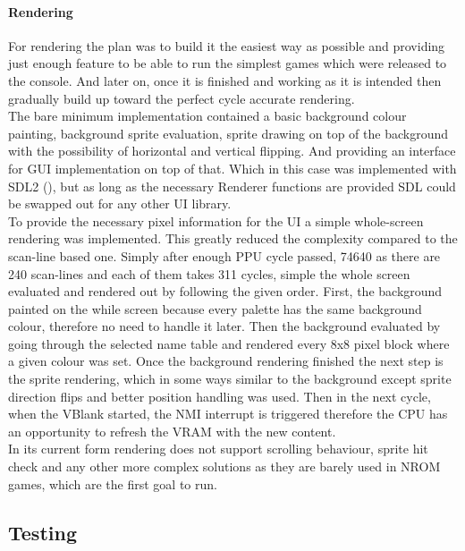 \documentclass[]{report}
\begin{document}
\paragraph{Rendering}
For rendering the plan was to build it the easiest way as possible and providing just enough feature to be able to run the simplest games which were released to the console. And later on, once it is finished and working as it is intended then gradually build up toward the perfect cycle accurate rendering.
\\
The bare minimum implementation contained a basic background colour painting, background sprite evaluation, sprite drawing on top of the background with the possibility of horizontal and vertical flipping. And providing an interface for GUI implementation on top of that. Which in this case was implemented with SDL2 (\cite{SDL2}), but as long as the necessary Renderer functions are provided SDL could be swapped out for any other UI library.
\\
To provide the necessary pixel information for the UI a simple whole-screen rendering was implemented. This greatly reduced the complexity compared to the scan-line based one. Simply after enough PPU cycle passed, 74640 as there are 240 scan-lines and each of them takes 311 cycles, simple the whole screen evaluated and rendered out by following the given order. First, the background painted on the while screen because every palette has the same background colour, therefore no need to handle it later. Then the background evaluated by going through the selected name table and rendered every 8x8 pixel block where a given colour was set. Once the background rendering finished the next step is the sprite rendering, which in some ways similar to the background except sprite direction flips and better position handling was used.
Then in the next cycle, when the VBlank started, the NMI interrupt is triggered therefore the CPU has an opportunity to refresh the VRAM with the new content.
\\
In its current form rendering does not support scrolling behaviour, sprite hit check and any other more complex solutions as they are barely used in NROM games, which are the first goal to run.

\subsection{Testing}
\end{document}
